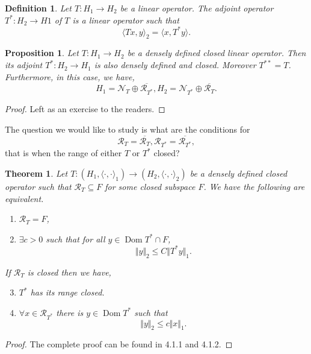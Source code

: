 \documentclass{article}
\newtheorem{theorem}{Theorem} [section]
\newtheorem{proposition}{Proposition}[section]
\newtheorem{definition}{Definition}[section]
\DeclareMathOperator{\Dom}{Dom}
\newcommand{\norm}[1]{\Vert #1 \Vert}
\begin{document}
\begin{definition}
  Let $T:H_1\to H_2$ be a linear operator. The adjoint operator $T^*:H_2\to H1$ of $T$ is a linear operator such that 
  \begin{equation*}
    \langle Tx,y\rangle_2 = \langle x,T^*y\rangle.
  \end{equation*}
\end{definition}
\begin{proposition}
  Let $T:H_1\to H_2$ be a densely defined closed linear operator. Then its adjoint $T^*:H_2\to H_1$ is also densely defined and closed. Moreover $T^{**}=T$.
  Furthermore, in this case, we have,
  \begin{equation*}
    H_1 = \mathcal{N}_T\oplus \overline{\mathcal{R}_{T^*}},H_2 = \mathcal{N}_{T^*}\oplus \overline{\mathcal{R}_{T}}.
  \end{equation*}
\end{proposition}
\begin{proof}
  Left as an exercise to the readers.
\end{proof}
The question we would like to study is what are the conditions for 
\begin{equation*}
  \mathcal{R}_T = \overline{\mathcal{R}_T},\mathcal{R}_{T^*} = \overline{\mathcal{R}_{T^*}},
\end{equation*}
that is when the range of either $T$ or $T^*$ closed?
\begin{theorem}
  Let $T:(H_1,\langle\cdot,\cdot\rangle_1)\to(H_2,\langle\cdot,\cdot\rangle_2)$ be a densely defined closed operator such that $\mathcal{R}_T\subseteq F$ for some closed subspace $F$. We have the following are equivalent.
  \begin{enumerate}[1).]
    \item $\mathcal{R}_T=F$,
    \item $\exists c>0$ such that for all $y\in\Dom T^*\cap F$,
    \begin{equation*}
      \norm{y}_2\leq C\norm{T^*y}_1.
    \end{equation*}
  \end{enumerate}
  If $\mathcal{R}_T$ is closed then we have,
  \begin{enumerate}[1).]
    \setcounter{enumi}{2}
    \item $T^*$ has its range closed.
    \item $\forall x\in\mathcal{R}_{T^*}$ there is $y\in\Dom T^*$ such that 
    \begin{equation*}
      \norm{y}_2\leq c\norm{x}_1.
    \end{equation*}
  \end{enumerate}
  \label{theorem_closedness_range}
\end{theorem}
\begin{proof}
  The complete proof can be found in \cite{Hom} 4.1.1 and 4.1.2.
\end{proof}
\end{document}
